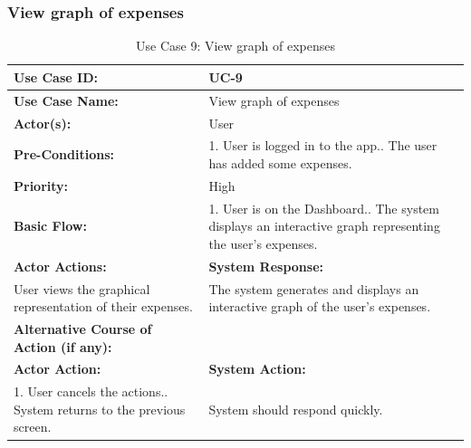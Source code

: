 \documentclass[12pt]{article}
\begin{document}
\subsubsection{View graph of expenses}
\vspace{0.5 cm}
    \begin{table}[H] %
    \centering
    \begin{tabular}{|p{4cm}|p{10cm}|}
        \hline
        \textbf{Use Case ID:} & UC-9 \\ \hline
        \textbf{Use Case Name:} & View graph of expenses \\ \hline
        \textbf{Actor(s):} & User \\ \hline
        \textbf{Pre-Conditions:} & 
        1. User is logged in to the app.\newline
2. The user has added some expenses. \\ \hline
        \textbf{Priority:} & High \\ \hline
        \textbf{Basic Flow:} & 1. User is on the Dashboard.\newline
2. The system displays an interactive graph representing the user’s expenses.\\ \hline
        \textbf{Actor Actions:} & \textbf{System Response:} \\ \hline
        User views the graphical representation of their expenses.& The system generates and displays an interactive graph of the user's expenses. \\ \hline
        \textbf{Alternative Course of Action (if any):} &  \\ \hline
        \textbf{Actor Action:} & \textbf{System Action:} \\ \hline
      1. User cancels the actions.\newline
2. System returns to the previous screen. & System should respond quickly.\\ \hline
     \end{tabular} 
    \caption{Use Case 9: View graph of expenses}
\end{table}

\newpage
\vspace{1 cm} %
\noindent
\end{document}
